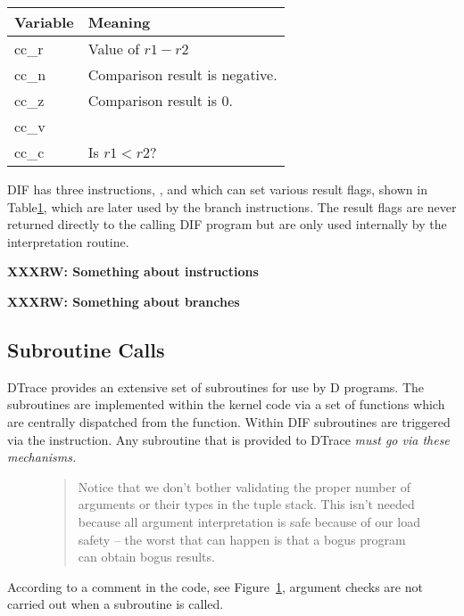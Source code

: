 \begin{table}
  \centering
    \begin{tabular}{|l|l|}
      \hline
      Variable & Meaning\\
      \hline
      cc\_r & Value of $r1 - r2$\\
      cc\_n & Comparison result is negative. \\
      cc\_z & Comparison result is 0.\\
      cc\_v & \\
      cc\_c & Is $r1 < r2$?\\
      \hline
  \end{tabular}
\label{tbl:cmp-vars}
\end{table}

DIF has three instructions, ,  and
 which can set various result flags, shown in
Table\ref{tbl:cmp-vars}, which are later used by the branch
instructions.  The result flags are never returned directly to the
calling DIF program but are only used internally by the interpretation
routine.

\textbf{XXXRW: Something about instructions}

\textbf{XXXRW: Something about branches}

\subsection{Subroutine Calls}
\label{sec:subroutines}

DTrace provides an extensive set of subroutines for use by D
programs.  The subroutines are implemented within the kernel code via
a set of functions which are centrally dispatched from the
 function.  Within DIF subroutines are
triggered via the  instruction.  Any subroutine that
is provided to DTrace \em{must} go via these mechanisms.

\begin{figure}
\begin{quote}
  Notice that we don't bother validating the proper number of
  arguments or their types in the tuple stack.  This isn't needed
  because all argument interpretation is safe because of our load
  safety -- the worst that can happen is that a bogus program can
  obtain bogus results.
\end{quote}
\label{fig:argcheck}
\end{figure}

According to a comment in the code, see Figure~\ref{fig:argcheck},
argument checks are not carried out when a subroutine is called.


